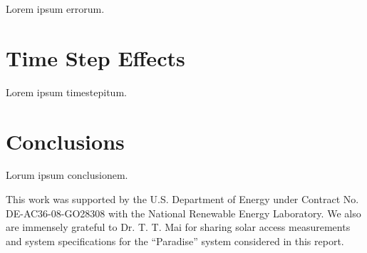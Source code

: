 \documentclass[twocolumn,10pt]{asme2ej}
\begin{document}
Lorem ipsum errorum.

\section{Time Step Effects}

Lorem ipsum timestepitum.

\section{Conclusions}

Lorum ipsum conclusionem.


\begin{acknowledgment}
This work was supported by the U.S. Department of Energy under Contract No. DE-AC36-08-GO28308 with the National Renewable Energy Laboratory.  We also are immensely grateful to Dr. T. T. Mai for sharing solar access measurements and system specifications for the ``Paradise'' system considered in this report.
\end{acknowledgment}

%
\end{document}
